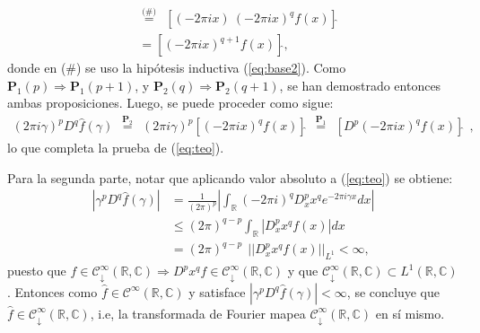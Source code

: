 \documentclass[spanish, fleqn]{article}
\begin{document}
\begin{description}
\begin{align*}
		&\stackrel{\text{(\#)}}{=} \ \ \left[(-2 \pi i x)\ (-2 \pi i x)^q f(x) \right]\widehat{} \\
		&= \left[(-2 \pi i x)^{q+1} f(x) \right]\widehat{},
	\end{align*}
	donde en (\#) se uso la hipótesis inductiva (\ref{eq:base2}). Como $\mathbf{P}_1(p)\Rightarrow \mathbf{P}_1(p+1)$,
	y $\mathbf{P}_2(q) \Rightarrow \mathbf{P}_2(q+1)$, se han demostrado entonces ambas proposiciones. Luego, se puede proceder como sigue:
	\begin{align*}
		(2 \pi i \gamma)^p D^q \widehat{f}(\gamma) \ \ \stackrel{\mathbf{P}_2}{=} \ \ (2 \pi i \gamma)^p \left[ (-2 \pi i x)^q f(x) \right]\widehat{} \ \ \stackrel{\mathbf{P}_1}{=} \ \ \left[ D^p (-2 \pi i x)^q f(x) \right]\widehat{}\ \ ,
	\end{align*}
	lo que completa la prueba de (\ref{eq:teo}).

	Para la segunda parte, notar que aplicando valor absoluto a (\ref{eq:teo}) se obtiene:
	\begin{align*}
		\left|\gamma^p D^q \widehat{f}(\gamma)\right| &= \frac{1}{(2 \pi)^p} \left| \int_{\mathbb{R}} (-2 \pi i)^q D_{x}^{p} x^q e^{-2 \pi i \gamma x} dx \right| \\
		&\leq (2 \pi)^{q-p} \int_{\mathbb{R}} \left| D_{x}^{p} x^q f(x) \right| dx \\
		&= (2 \pi)^{q-p} \ \ ||D_{x}^p x^q f(x)||_{L^1} < \infty,
	\end{align*}
	puesto que $f \in \mathcal{C}_{\downarrow}^\infty(\mathbb{R},\mathbb{C}) \Rightarrow  D^p x^q f \in \mathcal{C}_{\downarrow}^\infty(\mathbb{R},\mathbb{C})$ y que $\mathcal{C}_{\downarrow}^\infty(\mathbb{R},\mathbb{C}) \subset L^1(\mathbb{R},\mathbb{C})$. Entonces como $\widehat{f} \in \mathcal{C}^\infty(\mathbb{R},\mathbb{C})$ y satisface $\left|\gamma^p D^q \widehat{f}(\gamma)\right| < \infty$, se concluye que $\widehat{f} \in \mathcal{C}_{\downarrow}^\infty(\mathbb{R},\mathbb{C})$, i.e, la transformada de Fourier mapea $\mathcal{C}_{\downarrow}^\infty(\mathbb{R},\mathbb{C})$ en sí mismo.





\end{description}
\end{document}
